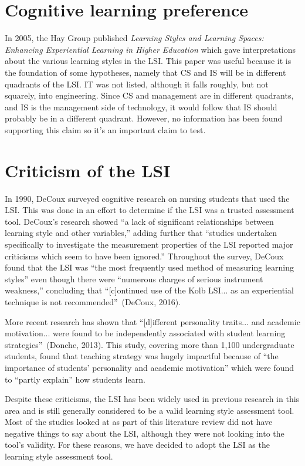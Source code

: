 \section{Cognitive learning preference}
In 2005, the Hay Group published \textit{Learning Styles and Learning Spaces: Enhancing Experiential Learning in Higher Education} which gave interpretations about the various learning styles in the LSI. This paper was useful because it is the foundation of some hypotheses, namely that CS and IS will be in different quadrants of the LSI. IT was not listed, although it falls roughly, but not squarely, into engineering. Since CS and management are in different quadrants, and IS is the management side of technology, it would follow that IS should probably be in a different quadrant. However, no information has been found supporting this claim so it's an important claim to test.

\section{Criticism of the LSI}
In 1990, DeCoux surveyed cognitive research on nursing students that used the LSI. This was done in an effort to determine if the LSI was a trusted assessment tool. DeCoux's research showed ``a lack of significant relationships between learning style and other variables,'' adding further that ``studies undertaken specifically to investigate the measurement properties of the LSI reported major criticisms which seem to have been ignored.'' Throughout the survey, DeCoux found that the LSI was ``the most frequently used method of measuring learning styles'' even though there were ``numerous charges of serious instrument weakness,'' concluding that ``[c]ontinued use of the Kolb LSI... as an experiential technique is not recommended''~(DeCoux, 2016).

More recent research has shown that ``[d]ifferent personality traits... and academic motivation... were found to be independently associated with student learning strategies''~(Donche, 2013). This study, covering more than 1,100 undergraduate students, found that teaching strategy was hugely impactful because of ``the importance of students' personality and academic motivation'' which were found to ``partly explain'' how students learn.

Despite these criticisms, the LSI has been widely used in previous research in this area and is still generally considered to be a valid learning style assessment tool. Most of the studies looked at as part of this literature review did not have negative things to say about the LSI, although they were not looking into the tool's validity. For these reasons, we have decided to adopt the LSI as the learning style assessment tool.

